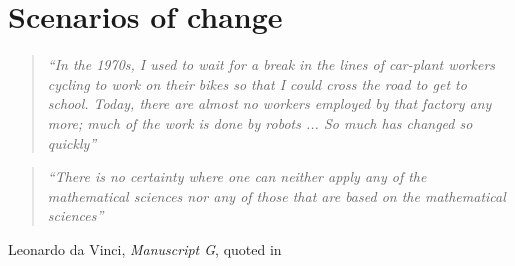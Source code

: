 \chapter{Scenarios of change} 
\label{Chapter8}
% 

\fancyhead[RE,LO]{\thepage}

\begin{quote}
\textit{ ``In the 1970s, I used to wait for a break in the lines
of car-plant workers cycling to work on their bikes so that I
could cross the road to get to school. Today, there are almost
no workers employed by that factory any more; much of the work is done by
robots ... So much has changed so quickly''}
\end{quote}
\begin{flushright}
\citet[p.~106]{dorling2013population}
\end{flushright}

\begin{quote}
\textit{``There is no certainty where one can neither apply any of the
mathematical sciences nor any of those that are based on the mathematical
sciences''}
\end{quote}
\begin{flushright}
Leonardo da Vinci, \emph{Manuscript G}, quoted in
\citep[p.~13]{rosci1978hidden}
\end{flushright}

